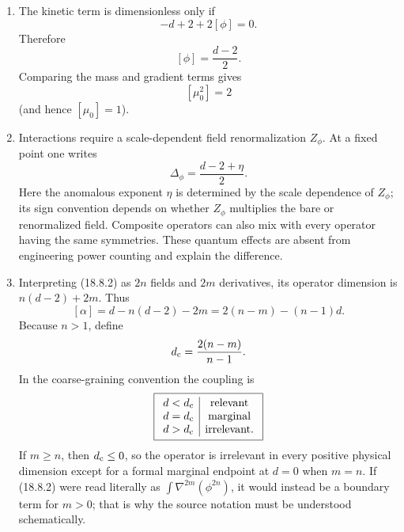 \begin{enumerate}
\begin{enumerate}
    \item[(b)]
    The kinetic term is dimensionless only if
    \[
      -d+2+2[\phi]=0.
    \]
    Therefore
    \[
      \boxed{[\phi]=\frac{d-2}{2}.}
    \]
    Comparing the mass and gradient terms gives
    \[
      \boxed{[\mu_0^2]=2}
    \]
    (and hence \([\mu_0]=1\)).

    \item[(c)]
    Interactions require a scale-dependent field renormalization
    \(Z_\phi\).  At a fixed point one writes
    \[
      \Delta_\phi=\frac{d-2+\eta}{2}.
    \]
    Here the anomalous exponent \(\eta\) is determined by the scale
    dependence of \(Z_\phi\); its sign convention depends on whether
    \(Z_\phi\) multiplies the bare or renormalized field.
    Composite operators can also mix with every operator having the same
    symmetries.  These quantum effects are absent from engineering power
    counting and explain the difference.

    \item[(d)]
    Interpreting (18.8.2) as \(2n\) fields and \(2m\) derivatives, its
    operator dimension is \(n(d-2)+2m\).  Thus
    \[
      \boxed{[\alpha]
        =d-n(d-2)-2m
        =2(n-m)-(n-1)d.}
      \tag{18.8.S1}
    \]
    Because \(n>1\), define
    \[
      d_{\rm c}=\frac{2(n-m)}{n-1}.
    \]
    In the coarse-graining convention the coupling is
    \[
      \boxed{\begin{array}{c|c}
        d<d_{\rm c}&\hbox{relevant}\\
        d=d_{\rm c}&\hbox{marginal}\\
        d>d_{\rm c}&\hbox{irrelevant}.
      \end{array}}
    \]
    If \(m\geq n\), then \(d_{\rm c}\leq0\), so the operator is irrelevant
    in every positive physical dimension except for a formal marginal
    endpoint at \(d=0\) when \(m=n\).  If (18.8.2) were read literally as
    \(\int\nabla^{2m}(\phi^{2n})\), it would instead be a boundary term for
    \(m>0\); that is why the source notation must be understood
    schematically.


\end{enumerate}
\end{enumerate}
